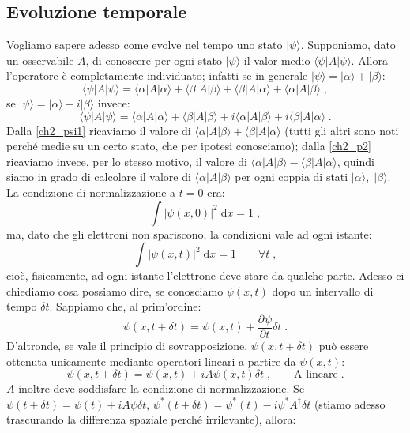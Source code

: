 \documentclass[10pt,a4paper]{report}
\theoremstyle{definition}
\newcommand{\pdev}[3][]{\frac{\partial^{#1} #2}{\partial #3^{#1}}}
\numberwithin{equation}{section}
\newcommand{\diff}[1][]{\mathrm{d}#1}
\newcommand{\bra}{\langle}
\newcommand{\ket}{\rangle}
\begin{document}
\subsection{Evoluzione temporale}
Vogliamo sapere adesso come evolve nel tempo uno stato $|\psi\ket$. Supponiamo, dato un osservabile $A$, di conoscere per ogni stato $|\psi\ket$ il valor medio $\bra\psi|A|\psi\ket$. Allora l'operatore è completamente individuato; infatti se in generale $|\psi\ket=|\alpha\ket+|\beta\ket$:
\begin{equation}
\bra\psi|A|\psi\ket=\bra\alpha|A|\alpha\ket+\bra\beta|A|\beta\ket+\bra\beta|A|\alpha\ket+\bra\alpha|A|\beta\ket\;,\label{ch2_psi1}
\end{equation}
se $|\psi\ket=|\alpha\ket+i|\beta\ket$ invece:
\begin{equation}
\bra\psi|A|\psi\ket=\bra\alpha|A|\alpha\ket+\bra\beta|A|\beta\ket+i\bra\alpha|A|\beta\ket+i\bra\beta|A|\alpha\ket\;.\label{ch2_psi2}
\end{equation}
Dalla \eqref{ch2_psi1} ricaviamo il valore di $\bra\alpha|A|\beta\ket+\bra\beta|A|\alpha\ket$ (tutti gli altri sono noti perché medie su un certo stato, che per ipotesi conosciamo); dalla \eqref{ch2_p2} ricaviamo invece, per lo stesso motivo, il valore di $\bra\alpha|A|\beta\ket-\bra\beta|A|\alpha\ket$, quindi siamo in grado di calcolare il valore di $\bra\alpha|A|\beta\ket$ per ogni coppia di stati $|\alpha\ket,\;|\beta\ket$. \\
La condizione di normalizzazione a $t=0$ era:
$$
\int |\psi(x,0)|^2\;\diff{x}=1\;,
$$
ma, dato che gli elettroni non spariscono, la condizioni vale ad ogni istante:
\begin{equation}
\int |\psi(x,t)|^2\;\diff{x}=1\qquad \forall t\;,
\end{equation}
cioè, fisicamente, ad ogni istante l'elettrone deve stare da qualche parte. Adesso ci chiediamo cosa possiamo dire, se conosciamo $\psi(x,t)$ dopo un intervallo di tempo $\delta t$. Sappiamo che, al prim'ordine:
\begin{equation}
\psi(x,t+\delta t)=\psi(x,t)+\pdev{\psi}{t}\delta t\;.
\end{equation}
D'altronde, se vale il principio di sovrapposizione, $\psi(x,t+\delta t)$ può essere ottenuta unicamente mediante operatori lineari a partire da $\psi(x,t)$:
\begin{equation}
\psi(x,t+\delta t)=\psi(x,t)+iA\psi(x,t)\delta t\;,\qquad \mbox{A lineare}\;.
\end{equation}
$A$ inoltre deve soddisfare la condizione di normalizzazione. Se $\psi(t+\delta t)=\psi(t)+iA\psi\delta t$, $\psi^*(t+\delta t)=\psi^*(t)-i\psi^*A^{\dagger}\delta t$ (stiamo adesso trascurando la differenza spaziale perché irrilevante), allora:
\end{document}
